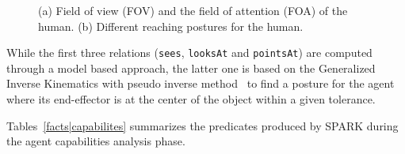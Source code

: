 \documentclass{svmult}
\newcommand{\concept}[1]{{\footnotesize \texttt{#1}}}
\begin{document}
\begin{figure}[!t]
	\begin{center}
	\caption{(a) Field of view (FOV) and the field of attention (FOA) of the human. (b) Different reaching postures for the human.}
	\label{fig::sparkRepresentations}
	\end{center}
\end{figure} 


While the first three relations (\concept{sees}, \concept{looksAt} and
\concept{pointsAt}) are computed through a model based approach, the latter one
is based on the Generalized Inverse Kinematics with pseudo inverse
method~\cite{Nakamura90,Baerlocher04} to find a posture for the
agent where its end-effector is at the center of the object within a given
tolerance.

Tables~\ref{facts|capabilites} summarizes the predicates produced by SPARK
during the agent capabilities analysis phase.
\end{document}
